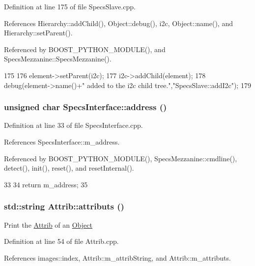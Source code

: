 Definition at line 175 of file SpecsSlave.cpp.

References Hierarchy::addChild(), Object::debug(), i2c, Object::name(), and Hierarchy::setParent().

Referenced by BOOST\_\-PYTHON\_\-MODULE(), and SpecsMezzanine::SpecsMezzanine().


\begin{DoxyCode}
175                                          {
176   element->setParent(i2c);
177   i2c->addChild(element);
178   debug(element->name()+" added to the i2c child tree.","SpecsSlave::addI2c");
179 }
\end{DoxyCode}
\hypertarget{classSpecsInterface_a0fa039a15b842a5ba783ce825b9915d8}{
\subsubsection[{address}]{\setlength{\rightskip}{0pt plus 5cm}unsigned char SpecsInterface::address ()}}
\label{classSpecsInterface_a0fa039a15b842a5ba783ce825b9915d8}


Definition at line 33 of file SpecsInterface.cpp.

References SpecsInterface::m\_\-address.

Referenced by BOOST\_\-PYTHON\_\-MODULE(), SpecsMezzanine::cmdline(), detect(), init(), reset(), and resetInternal().


\begin{DoxyCode}
33                                       {
34     return m_address;
35 }
\end{DoxyCode}
\hypertarget{classAttrib_aee7bbf16b144887f196e1341b24f8a26}{
\subsubsection[{attributs}]{\setlength{\rightskip}{0pt plus 5cm}std::string Attrib::attributs ()}}
\label{classAttrib_aee7bbf16b144887f196e1341b24f8a26}
Print the \hyperlink{classAttrib}{Attrib} of an \hyperlink{classObject}{Object} 

Definition at line 54 of file Attrib.cpp.

References images::index, Attrib::m\_\-attribString, and Attrib::m\_\-attributs.

